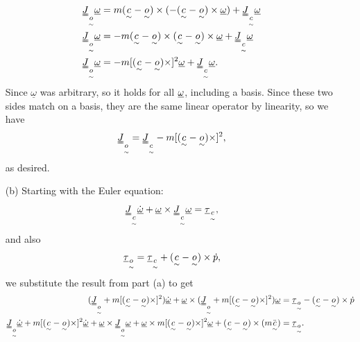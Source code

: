 \documentclass[11pt]{article}
\newcommand{\utilde}[1]{\underset{\sim}{#1}}
\begin{document}
\begin{enumerate}
\begin{align*}
            \uuline{J}_{\utilde{o}} \uline{\omega} &= m(\utilde{c} - \utilde{o}) \times ( -  (\utilde{c} - \utilde{o}) \times  \uline{\omega}) + \uuline{J}_{\utilde{c}}\underline{\omega}\\
            \uuline{J}_{\utilde{o}} \uline{\omega} &=  - m(\utilde{c} - \utilde{o}) \times (\utilde{c} - \utilde{o}) \times  \uline{\omega} + \uuline{J}_{\utilde{c}}\underline{\omega}\\
            \uuline{J}_{\utilde{o}} \uline{\omega} &=  - m[(\utilde{c} - \utilde{o}) \times]^2 \uline{\omega} + \uuline{J}_{\utilde{c}}\underline{\omega}
        .\end{align*}
        Since $\underline{\omega}$ was arbitrary, so it holds for all $\uline{\omega}$, including a basis.
        Since these two sides match on a basis, they are the same linear operator by linearity, so we have
        \begin{equation*}
            \uuline{J}_{\utilde{o}} =\uuline{J}_{\utilde{c}}- m[(\utilde{c} - \utilde{o}) \times]^2 
        ,\end{equation*}
        as desired.
    \item[(b)] Starting with the Euler equation:
        \[
            \uuline{J}_{\utilde{c}} \dot{\uline{\omega}} + \uline{\omega} \times  \uuline{J}_{\utilde{c}} \uline{\omega} = \uline{\tau}_{\utilde{c}}
        ,\] 
        and also
        \[
            \uline{\tau}_{\utilde{o}} = \uline{\tau}_{\utilde{c}} + (\utilde{c} - \utilde{o}) \times  \dot{p}
        ,\] 
        we substitute the result from part (a) to get
        \begin{align*}
            (\uuline{J}_{\utilde{o}} + m[(\utilde{c} - \utilde{o}) \times ]^2) \dot{\uline{\omega}} + \uline{\omega} \times  (\uuline{J}_{\utilde{o}} + m[(\utilde{c} - \utilde{o}) \times ]^2)\uline{\omega} &= \uline{\tau}_{\utilde{o}} - (\utilde{c} - \utilde{o}) \times  \dot{p}\\
            \uuline{J}_{\utilde{o}} \dot{\uline{\omega}}+ m[(\utilde{c} - \utilde{o}) \times ]^2 \dot{\uline{\omega}} + \uline{\omega} \times \uuline{J}_{\utilde{o}} \uline{\omega} + \uline{\omega} \times  m[(\utilde{c} - \utilde{o}) \times ]^2\uline{\omega} + (\utilde{c} - \utilde{o}) \times (m\ddot{\utilde{c}}) &= \uline{\tau}_{\utilde{o}}
        .\end{align*}


\end{enumerate}
\end{document}
